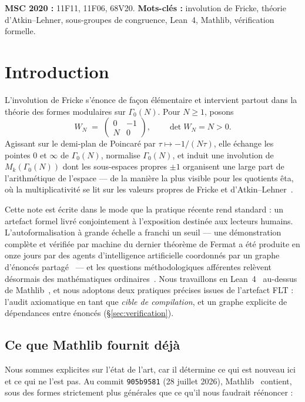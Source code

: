 \documentclass[11pt, a4paper]{article}
\theoremstyle{remark}
\begin{document}
\noindent\textbf{MSC 2020 :} 11F11, 11F06, 68V20.\quad
\textbf{Mots-clés :} involution de Fricke, théorie d'Atkin--Lehner, sous-groupes de congruence,
Lean~4, Mathlib, vérification formelle.

\section{Introduction}

L'involution de Fricke s'énonce de façon élémentaire et intervient partout dans la théorie des
formes modulaires sur $\Gamma_0(N)$. Pour $N \ge 1$, posons
\[
  W_N \;=\; \begin{pmatrix} 0 & -1 \\ N & 0 \end{pmatrix}, \qquad \det W_N = N > 0 .
\]
Agissant sur le demi-plan de Poincaré par $\tau \mapsto -1/(N\tau)$, elle échange les pointes $0$
et $\infty$ de $\Gamma_0(N)$, normalise $\Gamma_0(N)$, et induit une involution de
$M_k(\Gamma_0(N))$ dont les sous-espaces propres $\pm 1$ organisent une large part de
l'arithmétique de l'espace --- de la manière la plus visible pour les quotients êta, où la
multiplicativité se lit sur les valeurs propres de Fricke et
d'Atkin--Lehner~\cite{Martin1996, Ono2004}.

Cette note est écrite dans le mode que la pratique récente rend standard : un artefact formel livré
conjointement à l'exposition destinée aux lecteurs humains. L'autoformalisation à grande échelle a
franchi un seuil --- une démonstration complète et vérifiée par machine du dernier théorème de
Fermat a été produite en onze jours par des agents d'intelligence artificielle coordonnés par un
graphe d'énoncés partagé~\cite{FLT2026, Prove2Me2026} --- et les questions méthodologiques
afférentes relèvent désormais des mathématiques ordinaires~\cite{Tao2026AI, Buzzard2021}. Nous
travaillons en Lean~4~\cite{deMoura2021} au-dessus de Mathlib~\cite{Mathlib2020}, et nous adoptons
deux pratiques précises issues de l'artefact FLT : l'audit axiomatique en tant que \emph{cible de
compilation}, et un graphe explicite de dépendances entre énoncés (\S\ref{sec:verification}).

\subsection*{Ce que Mathlib fournit déjà}

Nous sommes explicites sur l'état de l'art, car il détermine ce qui est nouveau ici et ce qui ne
l'est pas. Au commit \texttt{905b9581} (28 juillet 2026), Mathlib~\cite{Mathlib2020} contient, sous
des formes strictement plus générales que ce qu'il nous faudrait réénoncer :
\end{document}
